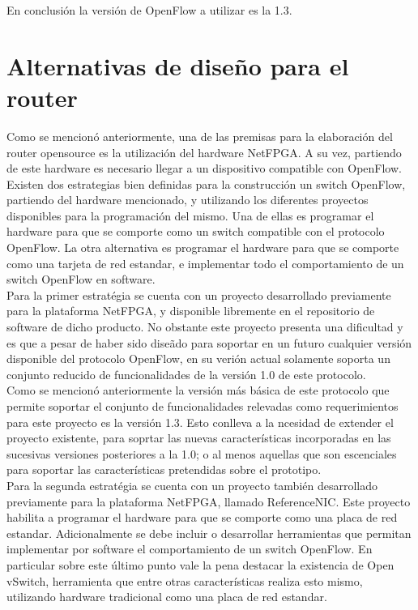 En conclusi\'on la versi\'on de OpenFlow a utilizar es la 1.3.

\section[Alternativas de dise\~no para el router]{Alternativas de dise\~no para el router}

Como se mencion\'o anteriormente, una de las premisas para la elaboraci\'on del router opensource es la utilizaci\'on del hardware NetFPGA. A su vez, partiendo de este hardware es necesario llegar a un dispositivo compatible con OpenFlow.\\ 

Existen dos estrategias bien definidas para la construcci\'on un switch OpenFlow, partiendo del hardware mencionado, y utilizando los diferentes proyectos disponibles para la programaci\'on del mismo. Una de ellas es programar el hardware para que se comporte como un switch compatible con el protocolo OpenFlow. La otra alternativa es programar el hardware para que se comporte como una tarjeta de red estandar, e implementar todo el comportamiento de un switch OpenFlow en software.\\

Para la primer estrat\'egia se cuenta con un proyecto desarrollado previamente para la plataforma NetFPGA, y disponible libremente en el repositorio de software de dicho producto. No obstante este proyecto presenta una dificultad y es que a pesar de haber sido dise\~ado para soportar en un futuro cualquier versi\'on disponible del protocolo OpenFlow, en su veri\'on actual solamente soporta un conjunto reducido de funcionalidades de la versi\'on 1.0 de este protocolo. \\
Como se mencion\'o anteriormente la versi\'on m\'as b\'asica de este protocolo que permite soportar el conjunto de funcionalidades relevadas como requerimientos para este proyecto es la versi\'on 1.3. Esto conlleva a la ncesidad de extender el proyecto existente, para soprtar las nuevas caracter\'isticas incorporadas en las sucesivas versiones posteriores a la 1.0; o al menos aquellas que son escenciales para soportar las caracter\'isticas pretendidas sobre el prototipo.\\

Para la segunda estrat\'egia se cuenta con un proyecto tambi\'en desarrollado previamente para la plataforma NetFPGA, llamado ReferenceNIC. Este proyecto habilita a programar el hardware para que se comporte como una placa de red estandar. Adicionalmente se debe incluir o desarrollar herramientas que permitan implementar por software el comportamiento de un switch OpenFlow. En particular sobre este \'ultimo punto vale la pena destacar la existencia de Open vSwitch, herramienta que entre otras caracter\'isticas realiza esto mismo, utilizando hardware tradicional como una placa de red estandar.

